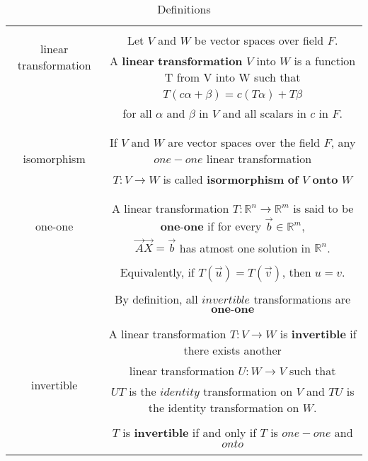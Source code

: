 \begin{table*}[!ht]
	\begin{center}
\resizebox{2\columnwidth}{!}
{
		\begin{tabular}{|c|c|}
			\hline
			\multirow{3}{*}{linear transformation} & \\
			& Let $V$ and $W$ be vector spaces over field $F$.\\
			& A $\textbf{linear transformation}$ $V$ into $W$ is a function T from V into W such that\\
			& $T(c\alpha + \beta) = c(T\alpha) + T\beta$\\
			& for all $\alpha$ and $\beta$ in $V$ and all scalars in $c$ in $F$.\\
			& \\
			\hline
			\multirow{3}{*}{isomorphism} &\\
			& If $V$ and $W$ are vector spaces over the field $F$, any $one-one$ linear transformation \\
			& $T : V\rightarrow W$ is called $\textbf{isormorphism of}$ $V$ $\textbf{onto}$ $W$\\
			& \\
			\hline			
			\multirow{3}{*}{one-one} & \\
			& A linear transformation $T : \mathbb{R}^{n} \rightarrow \mathbb{R}^{m}$ is said to be $\textbf{one-one}$ if for every  $\vec{b} \in \mathbb{R}^{m}$,\\
			&  $\vec{A}\vec{X} =\vec{b}$ has atmost one solution in $\mathbb{R}^{n}$.\\
			& \\
			& Equivalently, if $T(\vec{u}) = T(\vec{v})$, then $u = v$. \\
			& \\
			& By definition, all $invertible$ transformations are $\textbf{one-one}$\\
			& \\
			\hline
			\multirow{6}{*}{invertible} & \\
			& A linear transformation $T : V \rightarrow W$ is $\textbf{invertible}$ if there exists another\\
			& linear transformation $U: W \rightarrow V$ such that \\
			& $UT$ is the $identity$ transformation on $V$ and $TU$ is the identity transformation on $W$.\\
			& \\
			& $T$ is $\textbf{invertible}$ if and only if $T$ is $one-one$ and $onto$\\
			& \\
			\hline
		\end{tabular}
}
	\end{center}
\caption{Definitions}
\label{table:solutions/3/3/7/1}
\end{table*}
